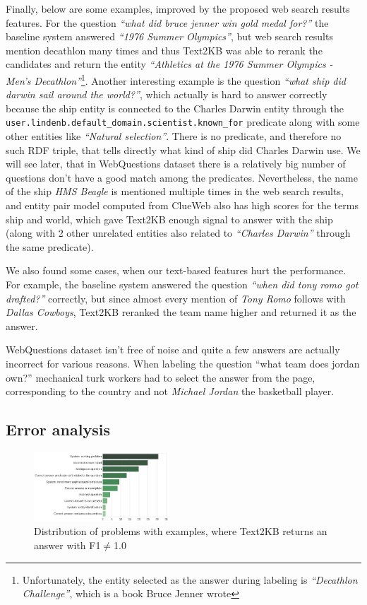 Finally, below are some examples, improved by the proposed web search results features.
For the question \textit{``what did bruce jenner win gold medal for?''} the baseline system answered \textit{``1976 Summer Olympics''}, but web search results mention decathlon many times and thus Text2KB was able to rerank the candidates and return the entity \textit{``Athletics at the 1976 Summer Olympics - Men's Decathlon''}\footnote{Unfortunately, the entity selected as the answer during labeling is \textit{``Decathlon Challenge''}, which is a book Bruce Jenner wrote}.
Another interesting example is the question \textit{``what ship did darwin sail around the world?''}, which actually is hard to answer correctly because the ship entity is connected to the Charles Darwin entity through the \texttt{user.lindenb.default\_domain.scientist.known\_for} predicate along with some other entities like \textit{``Natural selection''}.
There is no predicate, and therefore no such RDF triple, that tells directly what kind of ship did Charles Darwin use.
We will see later, that in WebQuestions dataset there is a relatively big number of questions don't have a good match among the predicates.
Nevertheless, the name of the ship \textit{HMS Beagle} is mentioned multiple times in the web search results, and entity pair model computed from ClueWeb also has high scores for the terms ship and world, which gave Text2KB enough signal to answer with the ship (along with 2 other unrelated entities also related to \textit{``Charles Darwin''} through the same predicate).

We also found some cases, when our text-based features hurt the performance.
For example, the baseline system answered the question \textit{``when did tony romo got drafted?''} correctly, but since almost every mention of \textit{Tony Romo} follows with \textit{Dallas Cowboys}, Text2KB reranked the team name higher and returned it as the answer.

WebQuestions dataset isn't free of noise and quite a few answers are actually incorrect for various reasons.
When labeling the question ``what team does jordan own?'' mechanical turk workers had to select the answer from the page, corresponding to the country and not \textit{Michael Jordan} the basketball player.

\subsection{Error analysis}

\begin{figure}
\centering
\includegraphics[width=0.45\textwidth]{img/error_analysis}
\caption{Distribution of problems with examples, where Text2KB returns an answer with F1$\neq$1.0}
\label{fig:error_analysis}
\end{figure}

